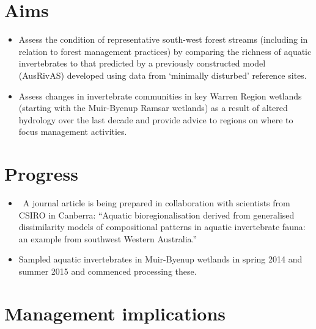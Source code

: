 \documentclass[version=last,
    paper=a4, %
    10pt, %
    usenames,
    dvipsnames,
    oneside, %
    headings=openany, %
    DIV=15 %
]{scrbook}
\begin{document}
\section*{Aims}

\begin{itemize}
\itemsep1pt\parskip0pt
\item
  Assess the condition of representative south-west forest streams
  (including in relation to forest management practices) by comparing
  the richness of aquatic invertebrates to that predicted by a
  previously constructed model (AusRivAS) developed using data from
  `minimally disturbed' reference sites.
\item
  Assess changes in invertebrate communities in key Warren Region
  wetlands (starting with the Muir-Byenup Ramsar wetlands) as a result
  of altered hydrology over the last decade and provide advice to
  regions on where to focus management activities.
\end{itemize}




\section*{Progress}

\begin{itemize}
\itemsep1pt\parskip0pt
\item
  ~A journal article is being prepared in collaboration with scientists
  from CSIRO in Canberra: ``Aquatic bioregionalisation derived from
  generalised dissimilarity models of compositional patterns in aquatic
  invertebrate fauna: an example from southwest Western Australia.''
\item
  Sampled aquatic invertebrates in Muir-Byenup wetlands in spring 2014
  and summer 2015 and commenced processing these.
\end{itemize}




\section*{Management implications}
\end{document}
